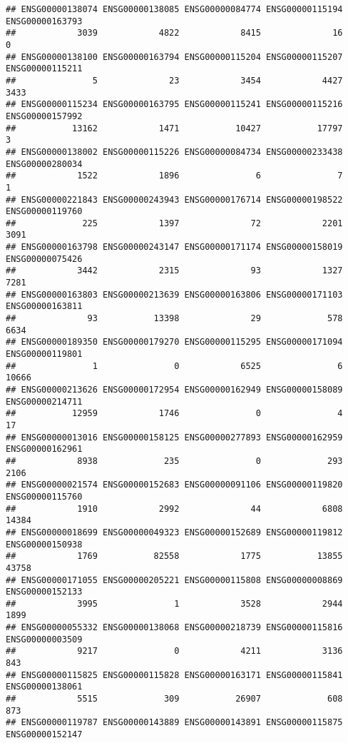 \documentclass[
]{article}
\begin{document}
\begin{verbatim}
## ENSG00000138074 ENSG00000138085 ENSG00000084774 ENSG00000115194 ENSG00000163793 
##            3039            4822            8415              16               0 
## ENSG00000138100 ENSG00000163794 ENSG00000115204 ENSG00000115207 ENSG00000115211 
##               5              23            3454            4427            3433 
## ENSG00000115234 ENSG00000163795 ENSG00000115241 ENSG00000115216 ENSG00000157992 
##           13162            1471           10427           17797               3 
## ENSG00000138002 ENSG00000115226 ENSG00000084734 ENSG00000233438 ENSG00000280034 
##            1522            1896               6               7               1 
## ENSG00000221843 ENSG00000243943 ENSG00000176714 ENSG00000198522 ENSG00000119760 
##             225            1397              72            2201            3091 
## ENSG00000163798 ENSG00000243147 ENSG00000171174 ENSG00000158019 ENSG00000075426 
##            3442            2315              93            1327            7281 
## ENSG00000163803 ENSG00000213639 ENSG00000163806 ENSG00000171103 ENSG00000163811 
##              93           13398              29             578            6634 
## ENSG00000189350 ENSG00000179270 ENSG00000115295 ENSG00000171094 ENSG00000119801 
##               1               0            6525               6           10666 
## ENSG00000213626 ENSG00000172954 ENSG00000162949 ENSG00000158089 ENSG00000214711 
##           12959            1746               0               4              17 
## ENSG00000013016 ENSG00000158125 ENSG00000277893 ENSG00000162959 ENSG00000162961 
##            8938             235               0             293            2106 
## ENSG00000021574 ENSG00000152683 ENSG00000091106 ENSG00000119820 ENSG00000115760 
##            1910            2992              44            6808           14384 
## ENSG00000018699 ENSG00000049323 ENSG00000152689 ENSG00000119812 ENSG00000150938 
##            1769           82558            1775           13855           43758 
## ENSG00000171055 ENSG00000205221 ENSG00000115808 ENSG00000008869 ENSG00000152133 
##            3995               1            3528            2944            1899 
## ENSG00000055332 ENSG00000138068 ENSG00000218739 ENSG00000115816 ENSG00000003509 
##            9217               0            4211            3136             843 
## ENSG00000115825 ENSG00000115828 ENSG00000163171 ENSG00000115841 ENSG00000138061 
##            5515             309           26907             608             873 
## ENSG00000119787 ENSG00000143889 ENSG00000143891 ENSG00000115875 ENSG00000152147 

\end{verbatim}
\end{document}
